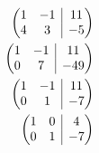 \documentclass{article}
\makeatletter
\newenvironment{amatrix}[1]{%
  \left(\begin{array}{@{}*{#1}{c}|c@{}}
    }{%
  \end{array}\right)
}
\makeatother
\begin{document}
\subsubsection{}

\begin{align*}
  \begin{amatrix}{2}
    1 & -1 & 11 \\
    4 & 3 & -5
  \end{amatrix} \\
  \begin{amatrix}{2}
    1 & -1 & 11 \\
    0 & 7 & -49
  \end{amatrix} \\
  \begin{amatrix}{2}
    1 & -1 & 11 \\
    0 & 1 & -7
  \end{amatrix} \\
  \begin{amatrix}{2}
    1 & 0 & 4 \\
    0 & 1 & -7
  \end{amatrix} \\
\end{align*}

\setcounter{subsubsection}{4}
\subsubsection{}
\end{document}
